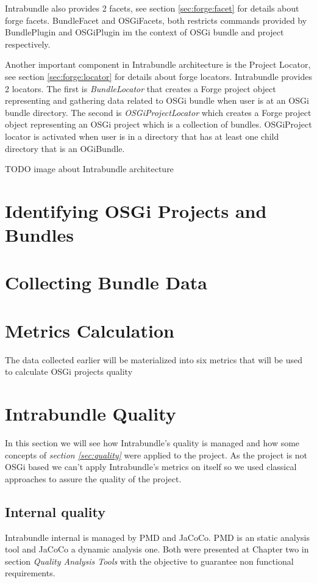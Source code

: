 Intrabundle also provides 2 facets, see section \ref{sec:forge:facet} for details about forge facets. BundleFacet and OSGiFacets, both restricts commands provided by BundlePlugin and OSGiPlugin im the context of OSGi bundle and project respectively.

Another important component in Intrabundle architecture is the Project Locator, see section \ref{sec:forge:locator} for details about forge locators. Intrabundle provides 2 locators. The first is \emph{BundleLocator} that creates a Forge project object representing and gathering data related to OSGi bundle when user is at an OSGi bundle directory. The second is \emph{OSGiProjectLocator} which creates a Forge project object representing an OSGi project which is a collection of bundles. OSGiProject locator is activated when user is in a directory that has at least one child directory that is an OGiBundle.          

TODO image about Intrabundle architecture

\section{Identifying OSGi Projects and Bundles}

\section{Collecting Bundle Data}

\section{Metrics Calculation}
The data collected earlier will be materialized into six metrics that will be used to calculate OSGi projects quality  

\section{Intrabundle Quality}
In this section we will see how Intrabundle's quality is managed and how some concepts of \textit{section \ref{sec:quality}} were applied to the project. As the project is not OSGi based we can't apply Intrabundle's metrics on itself so we used classical approaches to assure the quality of the project.

\subsection{Internal quality}
Intrabundle internal is managed by PMD and JaCoCo. PMD is an static analysis tool and JaCoCo a dynamic analysis one. Both were presented at Chapter two in section \textit{Quality Analysis Tools} with the objective to guarantee non functional requirements.

